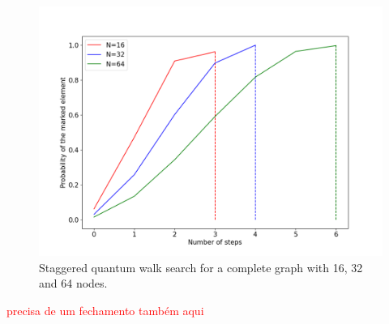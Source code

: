\documentclass[../../dissertation.tex]{subfiles}
\begin{document}
\begin{figure}[!h]
	\centering
	\includegraphics[scale=0.40]{img/StagQuantumWalk/Search/163264.png}
	\caption{Staggered quantum walk search for a complete graph with 16, 32 and 64 nodes.}\label{fig:StagSearch}
\end{figure}


\textcolor{red}{precisa de um fechamento também aqui}
\end{document}
